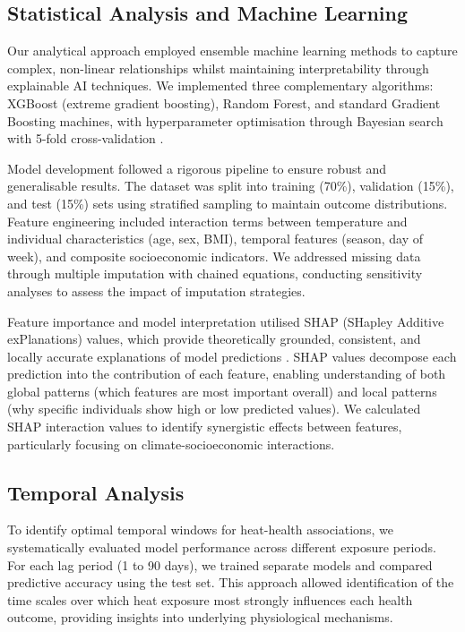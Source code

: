 \documentclass[11pt,a4paper]{article}
\begin{document}
\subsection{Statistical Analysis and Machine Learning}

Our analytical approach employed ensemble machine learning methods to capture complex, non-linear relationships whilst maintaining interpretability through explainable AI techniques. We implemented three complementary algorithms: XGBoost (extreme gradient boosting), Random Forest, and standard Gradient Boosting machines, with hyperparameter optimisation through Bayesian search with 5-fold cross-validation \citep{Chen2016, Breiman2001}.

Model development followed a rigorous pipeline to ensure robust and generalisable results. The dataset was split into training (70\%), validation (15\%), and test (15\%) sets using stratified sampling to maintain outcome distributions. Feature engineering included interaction terms between temperature and individual characteristics (age, sex, BMI), temporal features (season, day of week), and composite socioeconomic indicators. We addressed missing data through multiple imputation with chained equations, conducting sensitivity analyses to assess the impact of imputation strategies.

Feature importance and model interpretation utilised SHAP (SHapley Additive exPlanations) values, which provide theoretically grounded, consistent, and locally accurate explanations of model predictions \citep{Lundberg2017}. SHAP values decompose each prediction into the contribution of each feature, enabling understanding of both global patterns (which features are most important overall) and local patterns (why specific individuals show high or low predicted values). We calculated SHAP interaction values to identify synergistic effects between features, particularly focusing on climate-socioeconomic interactions.

\subsection{Temporal Analysis}

To identify optimal temporal windows for heat-health associations, we systematically evaluated model performance across different exposure periods. For each lag period (1 to 90 days), we trained separate models and compared predictive accuracy using the test set. This approach allowed identification of the time scales over which heat exposure most strongly influences each health outcome, providing insights into underlying physiological mechanisms.
\end{document}
